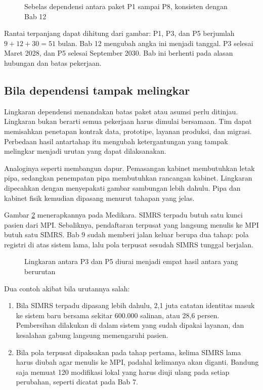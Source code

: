 \begin{figure}[!htb]
  \centering
  
  \caption{Sebelas dependensi antara paket P1 sampai P8, konsisten dengan Bab 12}
  \label{fig:ch11-keterkaitan-paket}
\end{figure}

Rantai terpanjang dapat dihitung dari gambar: P1, P3, dan P5 berjumlah $9 + 12 + 30 = 51$ bulan. Bab 12 mengubah
angka ini menjadi tanggal. P3 selesai Maret 2028, dan P5 selesai September 2030. Bab ini berhenti pada alasan
hubungan dan batas pekerjaan.

\subsection*{Bila dependensi tampak melingkar}

Lingkaran dependensi menandakan batas paket atau asumsi perlu ditinjau. Lingkaran bukan berarti semua pekerjaan
harus dimulai bersamaan. Tim dapat memisahkan penetapan kontrak data, prototipe, layanan produksi, dan migrasi.
Perbedaan hasil antartahap itu mengubah ketergantungan yang tampak melingkar menjadi urutan yang dapat dilaksanakan.

Analoginya seperti membangun dapur. Pemasangan kabinet membutuhkan letak pipa, sedangkan penempatan pipa
membutuhkan rancangan kabinet. Lingkaran dipecahkan dengan menyepakati gambar sambungan lebih dahulu. Pipa dan kabinet
fisik kemudian dipasang menurut tahapan yang jelas.

Gambar \ref{fig:ch11-dependensi} menerapkannya pada Medikara. SIMRS terpadu butuh satu kunci pasien dari MPI.
Sebaliknya, pendaftaran terpusat yang langsung menulis ke MPI butuh satu SIMRS. Bab 9 sudah memberi jalan keluar
berupa dua tahap: pola registri di atas sistem lama, lalu pola terpusat sesudah SIMRS tunggal berjalan.

\begin{figure}[!htb]
  \centering
  
  \caption{Lingkaran antara P3 dan P5 diurai menjadi empat hasil antara yang berurutan}
  \label{fig:ch11-dependensi}
\end{figure}

Dua contoh akibat bila urutannya salah:
\begin{enumerate}
  \item Bila SIMRS terpadu dipasang lebih dahulu, 2,1 juta catatan identitas masuk ke sistem baru bersama sekitar
        600.000 salinan, atau 28,6 persen. Pembersihan dilakukan di dalam sistem yang sudah dipakai layanan, dan
        kesalahan gabung langsung memengaruhi pasien.
  \item Bila pola terpusat dipaksakan pada tahap pertama, kelima SIMRS lama harus diubah agar menulis ke MPI, padahal
        kelimanya akan diganti. Bandung saja memuat 120 modifikasi lokal yang harus diuji ulang pada setiap perubahan,
        seperti dicatat pada Bab 7.
\end{enumerate}

